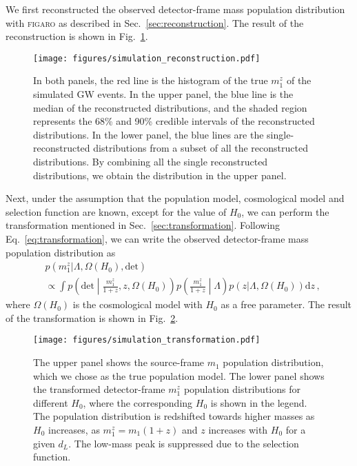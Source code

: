 \documentclass[sn-aps, pdflatex]{sn-jnl}
\begin{document}
We first reconstructed the observed detector-frame mass population distribution with \textsc{figaro} as described in Sec.~\ref{sec:reconstruction}.
The result of the reconstruction is shown in Fig.~\ref{fig:simulation_reconstruction}.
\begin{figure}[htbp]
    \texttt{[image: figures/simulation\_reconstruction.pdf]}
    \caption{
        In both panels, the red line is the histogram of the true $m^z_1$ of the simulated \ac{GW} events.
        In the upper panel, the blue line is the median of the reconstructed distributions, and the shaded region represents the 68\% and 90\% credible intervals of the reconstructed distributions.
        In the lower panel, the blue lines are the single-reconstructed distributions from a subset of all the reconstructed distributions.
        By combining all the single reconstructed distributions, we obtain the distribution in the upper panel.
    }
    \label{fig:simulation_reconstruction}
\end{figure}

Next, under the assumption that the population model, cosmological model and selection function are known, except for the value of $H_0$, we can perform the transformation mentioned in Sec.~\ref{sec:transformation}.
Following Eq.~\eqref{eq:transformation}, we can write the observed detector-frame mass population distribution as
\begin{equation}
    \begin{aligned}
        &p(m^z_1|\Lambda, \Omega(H_0), \mathrm{det}) \\
        &\propto \int p\left(\mathrm{det}\middle|\frac{m^z_1}{1+z},z,\Omega(H_0)\right)p\left(\frac{m^z_1}{1+z}\middle|\Lambda\right)p(z|\Lambda, \Omega(H_0)) \mathrm{d}z\,,
    \end{aligned}
    \label{eq:transformation_H0}
\end{equation}
where $\Omega(H_0)$ is the cosmological model with $H_0$ as a free parameter.
The result of the transformation is shown in Fig.~\ref{fig:simulation_transformation}.
\begin{figure}[htbp]
    \texttt{[image: figures/simulation\_transformation.pdf]}
    \caption{
        The upper panel shows the source-frame $m_1$ population distribution, which we chose as the true population model.
        The lower panel shows the transformed detector-frame $m^z_1$ population distributions for different $H_0$, where the corresponding $H_0$ is shown in the legend.
        The population distribution is redshifted towards higher masses as $H_0$ increases, as $m^z_1 = m_1(1+z)$ and $z$ increases with $H_0$ for a given $d_L$.
        The low-mass peak is suppressed due to the selection function.
    }
    \label{fig:simulation_transformation}
\end{figure}
\end{document}
